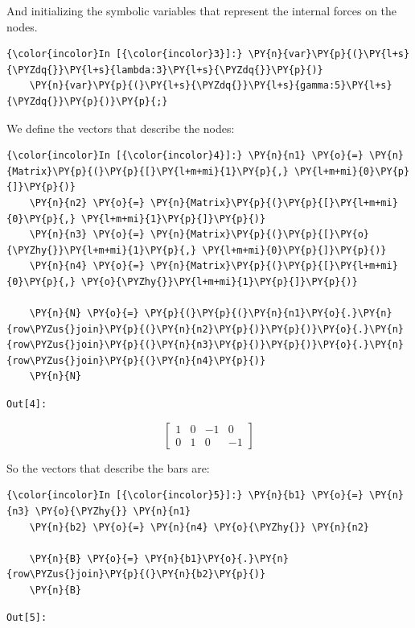 And initializing the symbolic variables that represent the internal
forces on the nodes.

\begin{Verbatim}[commandchars=\\\{\}]
    {\color{incolor}In [{\color{incolor}3}]:} \PY{n}{var}\PY{p}{(}\PY{l+s}{\PYZdq{}}\PY{l+s}{lambda:3}\PY{l+s}{\PYZdq{}}\PY{p}{)}
    \PY{n}{var}\PY{p}{(}\PY{l+s}{\PYZdq{}}\PY{l+s}{gamma:5}\PY{l+s}{\PYZdq{}}\PY{p}{)}\PY{p}{;}
\end{Verbatim}

We define the vectors that describe the nodes:

\begin{Verbatim}[commandchars=\\\{\}]
    {\color{incolor}In [{\color{incolor}4}]:} \PY{n}{n1} \PY{o}{=} \PY{n}{Matrix}\PY{p}{(}\PY{p}{[}\PY{l+m+mi}{1}\PY{p}{,} \PY{l+m+mi}{0}\PY{p}{]}\PY{p}{)}
    \PY{n}{n2} \PY{o}{=} \PY{n}{Matrix}\PY{p}{(}\PY{p}{[}\PY{l+m+mi}{0}\PY{p}{,} \PY{l+m+mi}{1}\PY{p}{]}\PY{p}{)}
    \PY{n}{n3} \PY{o}{=} \PY{n}{Matrix}\PY{p}{(}\PY{p}{[}\PY{o}{\PYZhy{}}\PY{l+m+mi}{1}\PY{p}{,} \PY{l+m+mi}{0}\PY{p}{]}\PY{p}{)}
    \PY{n}{n4} \PY{o}{=} \PY{n}{Matrix}\PY{p}{(}\PY{p}{[}\PY{l+m+mi}{0}\PY{p}{,} \PY{o}{\PYZhy{}}\PY{l+m+mi}{1}\PY{p}{]}\PY{p}{)}

    \PY{n}{N} \PY{o}{=} \PY{p}{(}\PY{p}{(}\PY{n}{n1}\PY{o}{.}\PY{n}{row\PYZus{}join}\PY{p}{(}\PY{n}{n2}\PY{p}{)}\PY{p}{)}\PY{o}{.}\PY{n}{row\PYZus{}join}\PY{p}{(}\PY{n}{n3}\PY{p}{)}\PY{p}{)}\PY{o}{.}\PY{n}{row\PYZus{}join}\PY{p}{(}\PY{n}{n4}\PY{p}{)}
    \PY{n}{N}
\end{Verbatim}
\texttt{\color{outcolor}Out[{\color{outcolor}4}]:}


\begin{equation*}
    \left[\begin{matrix}1 & 0 & -1 & 0\\0 & 1 & 0 & -1\end{matrix}\right]
\end{equation*}



So the vectors that describe the bars are:

\begin{Verbatim}[commandchars=\\\{\}]
    {\color{incolor}In [{\color{incolor}5}]:} \PY{n}{b1} \PY{o}{=} \PY{n}{n3} \PY{o}{\PYZhy{}} \PY{n}{n1}
    \PY{n}{b2} \PY{o}{=} \PY{n}{n4} \PY{o}{\PYZhy{}} \PY{n}{n2}

    \PY{n}{B} \PY{o}{=} \PY{n}{b1}\PY{o}{.}\PY{n}{row\PYZus{}join}\PY{p}{(}\PY{n}{b2}\PY{p}{)}
    \PY{n}{B}
\end{Verbatim}
\texttt{\color{outcolor}Out[{\color{outcolor}5}]:}


